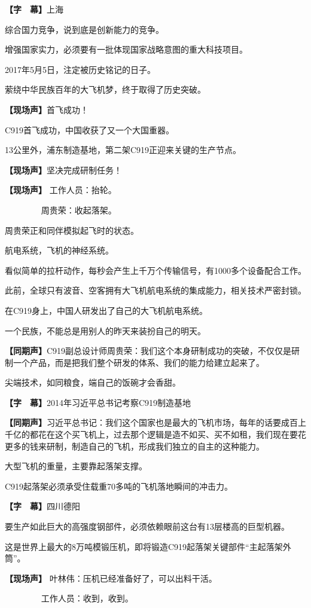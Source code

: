 \documentclass{ctexart}
\newcommand{\zkh}[1]{\textbf{\hspace{-2.7em} 【#1】}}
\begin{document}
 \zkh{字　幕}上海

 综合国力竞争，说到底是创新能力的竞争。

 增强国家实力，必须要有一批体现国家战略意图的重大科技项目。

 2017年5月5日，注定被历史铭记的日子。

 萦绕中华民族百年的大飞机梦，终于取得了历史突破。

 \zkh{现场声}首飞成功！

 C919首飞成功，中国收获了又一个大国重器。

 13公里外，浦东制造基地，第二架C919正迎来关键的生产节点。

 \zkh{现场声}坚决完成研制任务！

 \zkh{现场声} 工作人员：抬轮。

 　　　　 周贵荣：收起落架。

 周贵荣正和同伴模拟起飞时的状态。

 航电系统，飞机的神经系统。

 看似简单的拉杆动作，每秒会产生上千万个传输信号，有1000多个设备配合工作。

 此前，全球只有波音、空客拥有大飞机航电系统的集成能力，相关技术严密封锁。

 在C919身上，中国人研发出了自己的大飞机航电系统。

 一个民族，不能总是用别人的昨天来装扮自己的明天。

 \zkh{同期声}C919副总设计师周贵荣：我们这个本身研制成功的突破，不仅仅是研制一个产品，而是把我们整个研发的体系、我们的能力给建立起来了。

 尖端技术，如同粮食，端自己的饭碗才会香甜。

 \zkh{字　幕}2014年习近平总书记考察C919制造基地

 \zkh{同期声}习近平总书记：我们这个国家也是最大的飞机市场，每年的话要成百上千亿的都花在这个买飞机上，过去那个逻辑是造不如买、买不如租，我们现在要花更多的钱来研制，制造自己的飞机，形成我们独立的自主的这种能力。

 大型飞机的重量，主要靠起落架支撑。

 C919起落架必须承受住载重70多吨的飞机落地瞬间的冲击力。

 \zkh{字　幕}四川德阳

 
要生产如此巨大的高强度钢部件，必须依赖眼前这台有13层楼高的巨型机器。

 这是世界上最大的8万吨模锻压机，即将锻造C919起落架关键部件``主起落架外筒''。

 \zkh{现场声} 叶林伟：压机已经准备好了，可以出料干活。

 　　　　 工作人员：收到，收到。
\end{document}
